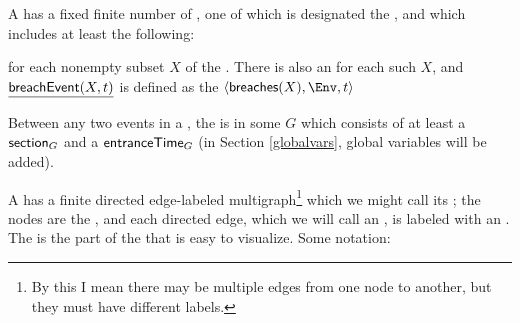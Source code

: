 \documentclass[12pt]{article}
\begin{document}
A \Contract has a fixed finite number of , one of which is designated the , and which includes at least the following:
\begin{LPPI}
\item {}
\item {} for each nonempty subset $X$ of the \Roles. There is also an \Action {} for each such $X$, and $\underline{\textsf{breachEvent}(X,t)}$ is defined as the \Event $\tup{\breaches{X}, \Env, t}$
\end{LPPI}
Between any two events in a \trace, the \Contract is in some  $G$ which consists of at least a \State $\textsf{section}_{G}$ and a \TimeStamp $\textsf{entranceTime}_{G}$ (in Section \ref{globalvars}, global variables will be added).

\medskip

A \Contract has a finite directed edge-labeled multigraph\footnote{By this I mean there may be multiple edges from one node to another, but they must have different labels.} which we might call its ; the nodes are the \States, and each directed edge, which we will call an , is labeled with an \Action. The \Map is the part of the \Contract that is easy to visualize. Some notation:
\end{document}
